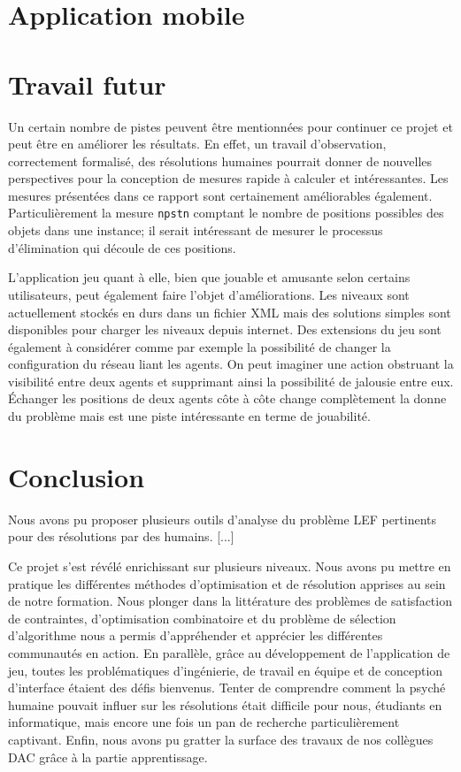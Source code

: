 \documentclass[a4paper, 11pt, titlepage]{article}
\begin{document}
	\section{Application mobile}
	    \label{app}
	    
	    
	\section{Travail futur}
    Un certain nombre de pistes peuvent être mentionnées pour continuer ce projet et peut être en améliorer les résultats. En effet, un travail d'observation, correctement formalisé, des résolutions humaines pourrait donner de nouvelles perspectives pour la conception de mesures rapide à calculer et intéressantes. Les mesures présentées dans ce rapport sont certainement améliorables également. Particulièrement la mesure \texttt{npstn} comptant le nombre de positions possibles des objets dans une instance; il serait intéressant de mesurer le processus d'élimination qui découle de ces positions. 
    
	L'application jeu quant à elle, bien que jouable et amusante selon certains utilisateurs, peut également faire l'objet d'améliorations. Les niveaux sont actuellement stockés en durs dans un fichier XML mais des solutions simples sont disponibles pour charger les niveaux depuis internet. Des extensions du jeu sont également à considérer comme par exemple la possibilité de changer la configuration du réseau liant les agents. On peut imaginer une action obstruant la visibilité entre deux agents et supprimant ainsi la possibilité de jalousie entre eux. Échanger les positions de deux agents côte à côte change complètement la donne du problème mais est une piste intéressante en terme de jouabilité. 
	
	\section{Conclusion}
	
	Nous avons pu proposer plusieurs outils d'analyse du problème LEF pertinents pour des résolutions  par des humains. 
	[...]
	
	Ce projet s'est révélé enrichissant sur plusieurs niveaux. Nous avons pu mettre en pratique les différentes méthodes d'optimisation et de résolution apprises au sein de notre formation. Nous plonger dans la littérature des problèmes de satisfaction de contraintes, d'optimisation combinatoire et du problème de sélection d'algorithme nous a permis d'appréhender et apprécier les différentes communautés en action. En parallèle, grâce au développement de l'application de jeu, toutes les problématiques d'ingénierie, de travail en équipe et de conception d'interface étaient des défis bienvenus. Tenter de comprendre comment la psyché humaine pouvait influer sur les résolutions était difficile pour nous, étudiants en informatique, mais encore une fois un pan de recherche particulièrement captivant. Enfin, nous avons pu gratter la surface des travaux de nos collègues DAC grâce à la partie apprentissage.
	
\end{document}
